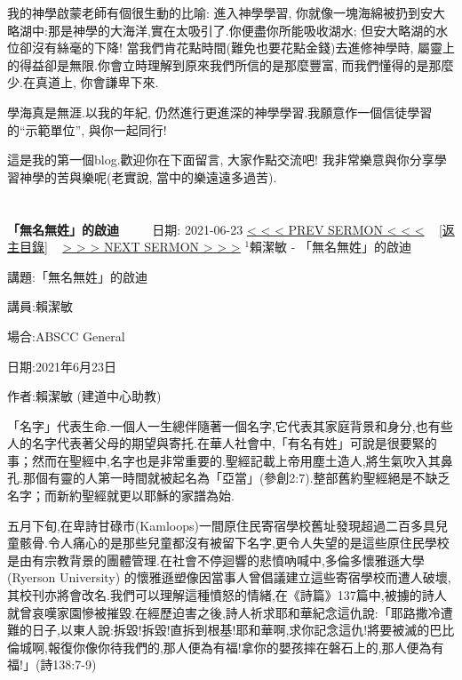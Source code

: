 \documentclass{book}
\begin{document}
 我的神學啟蒙老師有個很生動的比喻: 進入神學學習, 你就像一塊海綿被扔到安大略湖中:那是神學的大海洋,實在太吸引了.你便盡你所能吸收湖水; 但安大略湖的水位卻沒有絲毫的下降! 當我們肯花點時間(難免也要花點金錢)去進修神學時, 屬靈上的得益卻是無限.你會立時理解到原來我們所信的是那麼豐富, 而我們懂得的是那麼少.在真道上, 你會謙卑下來.

 學海真是無涯.以我的年紀, 仍然進行更進深的神學學習.我願意作一個信徒學習的“示範單位”, 與你一起同行!

 這是我的第一個blog.歡迎你在下面留言, 大家作點交流吧! 我非常樂意與你分享學習神學的苦與樂呢(老實說, 當中的樂遠遠多過苦).
\newpage



\section{}
\label{sec:1}
\textbf{「無名無姓」的啟迪}
\newline
\newline
~~~~ 日期: 2021-06-23
\newline
\newline
\hyperref[sec:0]{\small{< < < PREV SERMON < < <}}
~
\hyperref[sec:index]{\small{[返主目錄]}}
~
\hyperref[sec:2]{\small{> > > NEXT SERMON > > >}}
\newline
\newline
$^{1}$賴潔敏 - 「無名無姓」的啟迪

講題:「無名無姓」的啟迪

講員:賴潔敏

場合:ABSCC General

日期:2021年6月23日

作者:賴潔敏 (建道中心助教)

「名字」代表生命.一個人一生總伴隨著一個名字,它代表其家庭背景和身分,也有些人的名字代表著父母的期望與寄托.在華人社會中,「有名有姓」可說是很要緊的事；然而在聖經中,名字也是非常重要的.聖經記載上帝用塵土造人,將生氣吹入其鼻孔.那個有靈的人第一時間就被起名為「亞當」(參創2:7).整部舊約聖經絕是不缺乏名字；而新約聖經就更以耶穌的家譜為始.

五月下旬,在卑詩甘碌市(Kamloops)一間原住民寄宿學校舊址發現超過二百多具兒童骸骨.令人痛心的是那些兒童都沒有被留下名字,更令人失望的是這些原住民學校是由有宗教背景的團體管理.在社會不停迴響的悲憤吶喊中,多倫多懷雅遜大學(Ryerson University) 的懷雅遜塑像因當事人曾倡議建立這些寄宿學校而遭人破壞,其校刊亦將會改名.我們可以理解這種憤怒的情緒,在《詩篇》137篇中,被擄的詩人就曾哀嘆家園慘被摧毀.在經歷迫害之後,詩人祈求耶和華紀念這仇說:「耶路撒冷遭難的日子,以東人說:拆毀!拆毀!直拆到根基!耶和華啊,求你記念這仇!將要被滅的巴比倫城啊,報復你像你待我們的,那人便為有福!拿你的嬰孩摔在磐石上的,那人便為有福!」(詩138:7-9)
\end{document}
